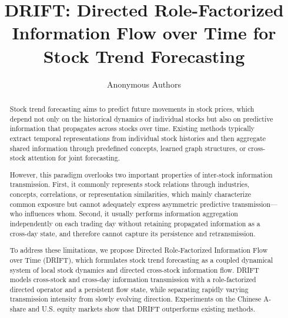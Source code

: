 \documentclass[letterpaper]{article}
\title{DRIFT: Directed Role-Factorized Information Flow over Time for Stock Trend Forecasting}
\author{Anonymous Authors}
\begin{document}
\maketitle

\begin{abstract}
Stock trend forecasting aims to predict future movements in stock prices, which depend not only on the historical dynamics of individual stocks but also on predictive information that propagates across stocks over time. Existing methods typically extract temporal representations from individual stock histories and then aggregate shared information through predefined concepts, learned graph structures, or cross-stock attention for joint forecasting.

However, this paradigm overlooks two important properties of inter-stock information transmission. First, it commonly represents stock relations through industries, concepts, correlations, or representation similarities, which mainly characterize common exposure but cannot adequately express asymmetric predictive transmission---who influences whom. Second, it usually performs information aggregation independently on each trading day without retaining propagated information as a cross-day state, and therefore cannot capture its persistence and retransmission.

To address these limitations, we propose Directed Role-Factorized Information Flow over Time (DRIFT), which formulates stock trend forecasting as a coupled dynamical system of local stock dynamics and directed cross-stock information flow. DRIFT models cross-stock and cross-day information transmission with a role-factorized directed operator and a persistent flow state, while separating rapidly varying transmission intensity from slowly evolving direction. Experiments on the Chinese A-share and U.S. equity markets show that DRIFT outperforms existing methods.
\end{abstract}
\end{document}
